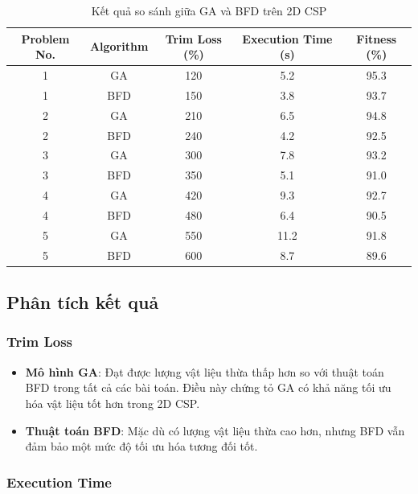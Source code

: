 \documentclass[a4paper]{article}
\begin{document}
\begin{table}[htbp]
    \centering
    \caption{Kết quả so sánh giữa GA và BFD trên 2D CSP}
    \label{tab:comparison}
    \begin{tabular}{|c|c|c|c|c|}
        \hline
        \textbf{Problem No.} & \textbf{Algorithm} & \textbf{Trim Loss (\%)} & \textbf{Execution Time (s)} & \textbf{Fitness (\%)} \\
        \hline
        1 & GA & 120 & 5.2 & 95.3 \\
        1 & BFD & 150 & 3.8 & 93.7 \\
        \hline
        2 & GA & 210 & 6.5 & 94.8 \\
        2 & BFD & 240 & 4.2 & 92.5 \\
        \hline
        3 & GA & 300 & 7.8 & 93.2 \\
        3 & BFD & 350 & 5.1 & 91.0 \\
        \hline
        4 & GA & 420 & 9.3 & 92.7 \\
        4 & BFD & 480 & 6.4 & 90.5 \\
        \hline
        5 & GA & 550 & 11.2 & 91.8 \\
        5 & BFD & 600 & 8.7 & 89.6 \\
        \hline
    \end{tabular}
\end{table}

\subsection{Phân tích kết quả}

\subsubsection{Trim Loss}

\begin{itemize}
    \item \textbf{Mô hình GA}: Đạt được lượng vật liệu thừa thấp hơn so với thuật toán BFD trong tất cả các bài toán. Điều này chứng tỏ GA có khả năng tối ưu hóa vật liệu tốt hơn trong 2D CSP.
    \item \textbf{Thuật toán BFD}: Mặc dù có lượng vật liệu thừa cao hơn, nhưng BFD vẫn đảm bảo một mức độ tối ưu hóa tương đối tốt.
\end{itemize}

\subsubsection{Execution Time}
\end{document}
